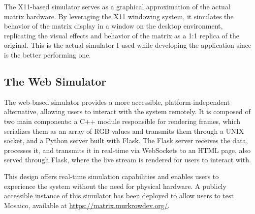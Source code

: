 The X11-based simulator serves as a graphical approximation of the actual matrix hardware. By leveraging the X11 windowing system, it simulates the behavior of the matrix display in a window on the desktop environment, replicating the visual effects and behavior of the matrix as a 1:1 replica of the original. This is the actual simulator I used while developing the application since is the better performing one.

\subsection{The Web Simulator}
\label{web-simulator}
The web-based simulator provides a more accessible, platform-independent alternative, allowing users to interact with the system remotely. It is composed of two main components: a C++ module responsible for rendering frames, which serializes them as an array of RGB values and transmits them through a UNIX socket, and a Python server built with Flask. The Flask server receives the data, processes it, and transmits it in real-time via WebSockets to an HTML page, also served through Flask, where the live stream is rendered for users to interact with.

This design offers real-time simulation capabilities and enables users to experience the system without the need for physical hardware. A publicly accessible instance of this simulator has been deployed to allow users to test Mosaico, available at \url{https://matrix.murkrowdev.org/}.